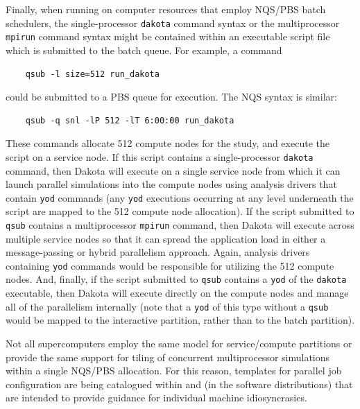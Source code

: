 Finally, when running on computer resources that employ NQS/PBS 
batch schedulers, the single-processor \texttt{dakota} command syntax or the
multiprocessor \texttt{mpirun} command syntax might be contained
within an executable script file which is submitted to the batch
queue. For example, a command
\begin{small}
\begin{verbatim}
    qsub -l size=512 run_dakota
\end{verbatim}
\end{small}

could be submitted to a PBS queue for execution. The NQS syntax is 
similar:
\begin{small}
\begin{verbatim}
    qsub -q snl -lP 512 -lT 6:00:00 run_dakota
\end{verbatim}
\end{small}

These commands allocate 512 compute nodes for the study, and execute
the  script on a service node. If this script
contains a single-processor \texttt{dakota} command, then Dakota will
execute on a single service node from which it can launch parallel
simulations into the compute nodes using analysis drivers that contain
\texttt{yod} commands (any \texttt{yod} executions occurring at any
level underneath the  script are mapped to the 512
compute node allocation). If the script submitted to \texttt{qsub}
contains a multiprocessor \texttt{mpirun} command, then Dakota will
execute across multiple service nodes so that it can spread the
application load in either a message-passing or hybrid parallelism
approach. Again, analysis drivers containing \texttt{yod} commands
would be responsible for utilizing the 512 compute nodes. And,
finally, if the script submitted to \texttt{qsub} contains a
\texttt{yod} of the \texttt{dakota} executable, then Dakota will
execute directly on the compute nodes and manage all of the
parallelism internally (note that a \texttt{yod} of this type without
a \texttt{qsub} would be mapped to the interactive partition, rather
than to the batch partition).

Not all supercomputers employ the same model for service/compute
partitions or provide the same support for tiling of concurrent
multiprocessor simulations within a single NQS/PBS allocation.  For
this reason, templates for parallel job configuration are being
catalogued within  and
 (in the software
distributions) that are intended to provide guidance for individual
machine idiosyncrasies.

